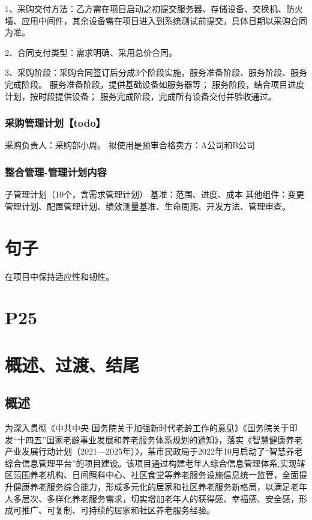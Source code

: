 \documentclass[UTF8]{../computerUniverse}
\begin{document}
1、采购交付方法：乙方需在项目启动之初提交服务器、存储设备、交换机、防火墙、应用中间件，其余设备需在项目进入到系统测试前提交，具体日期以采购合同为准。

2、合同支付类型：需求明确、采用总价合同。

3、采购阶段：采购合同签订后分成3个阶段实施，服务准备阶段、服务阶段、服务完成阶段。
服务准备阶段，提供基础设备如服务器等；
服务阶段，结合项目进度计划，按时段提供设备；
服务完成阶段，完成所有设备交付并验收通过。


\subsection{采购管理计划【todo】}
采购负责人：采购部小周。
拟使用是预审合格卖方：A公司和B公司


\subsection{整合管理-管理计划内容}

子管理计划（10个，含需求管理计划）
基准：范围、进度、成本
其他组件：变更管理计划、配置管理计划、绩效测量基准、生命周期、开发方法、管理审查。


\chapter{句子}

在项目中保持适应性和韧性。

\chapter{P25}

\chapter{概述、过渡、结尾}

\section{概述}

为深入贯彻《中共中央 国务院关于加强新时代老龄工作的意见》《国务院关于印发“十四五”国家老龄事业发展和养老服务体系规划的通知》，落实《智慧健康养老产业发展行动计划（2021—2025年）》，某市民政局于2022年10月启动了“智慧养老综合信息管理平台”的项目建设。该项目通过构建老年人综合信息管理体系,实现辖区范围养老机构、日间照料中心、社区食堂等养老服务设施信息统一监管，全面提升健康养老服务综合能力，形成多元化的居家和社区养老服务新格局，以满足老年人多层次、多样化养老服务需求，切实增加老年人的获得感、幸福感、安全感，形成可推广、可复制、可持续的居家和社区养老服务经验。
\end{document}
